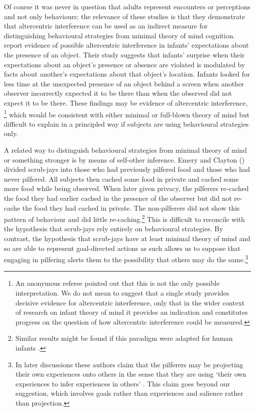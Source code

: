\documentclass[12pt,\papersize]{extarticle}
\begin{document}
Of course it was never in question that adults represent encounters or perceptions and not only behaviours; the relevance of these studies is that they demonstrate that altercentric interference can be used as an indirect measure for distinguishing behavioural strategies from minimal theory of mind cognition.  \citet[]{kovacs_social_2010} report evidence of possible altercentric interference in infants’ expectations about the presence of an object.  Their study suggests that infants’ surprise when their expectations about an object’s presence or absence are violated is modulated by facts about another’s expectations about that object’s location.  Infants looked for less time at the unexpected presence of an object behind a screen when another observer incorrectly expected it to be there than when the observed did not expect it to be there. These findings may be evidence of altercentric interference,%
\footnote{
An anonymous referee pointed out that  this is not the only possible interpretation.
We do not mean to suggest that a single study provides decisive evidence for altercentric interference, only that in the wider context of research on infant theory of mind  it provides an indication and constitutes progress on the question of how altercentric interference could be measured.
}
which would be consistent with either minimal or full-blown theory of mind but difficult to explain in a principled way if subjects are  using behavioural strategies only.

A related way to distinguish behavioural strategies from minimal theory of mind or something stronger is by means of self-other inference.  Emery and Clayton (\citeyear[]{en_1411}) divided scrub-jays into those who had previously pilfered food and those who had never pilfered.  All subjects then cached some food in private and cached some more food while being observed.  When later given privacy, the pilferers re-cached the food they had earlier cached in the presence of the observer but did not re-cache the food they had cached in private.  The non-pilferers did not show this pattern of behaviour and did little re-caching.\footnote{ 	Similar results might be found if this paradigm were adapted for human infants \citep[see][]{en_1707}.}  This is difficult to reconcile with the hypothesis that scrub-jays rely entirely on behavioural strategies.  By contrast, the hypothesis that scrub-jays have at least minimal theory of mind and so are able to represent goal-directed actions as such allows us to suppose that engaging in pilfering alerts them to the possibility that others may do the same.\footnote{ 	In later discussions these authors claim that the pilferers may be projecting their own experiences onto others in the sense that they are using `their own experiences to infer experiences in others' \citep[][p.\ 81]{Emery:2007ze}.  This claim goes beyond our suggestion, which involves goals rather than experiences and salience rather than projection.  }
\end{document}
